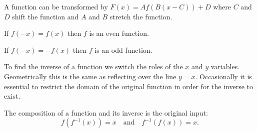 \begin{summary}
\item A function can be transformed by $F(x) = Af(B(x-C))+D$ where $C$ and $D$ shift the
    function and $A$ and $B$ stretch the function.
\item If $f(-x) = f(x)$ then $f$ is an even function.
\item If $f(-x) = -f(x)$ then $f$ is an odd function.
\item To find the inverse of a function we switch the roles of the $x$ and $y$ variables.
    Geometrically this is the same as reflecting over the line $y=x$.  Occasionally it is
    essential to restrict the domain of the original function in order for the inverse to
    exist.
\item The composition of a function and its inverse is the original input: 
    \[ f(f^{-1}(x)) = x \quad \text{and} \quad f^{-1}(f(x)) = x. \]
\end{summary}


\nin \hrulefill




\clearpage
